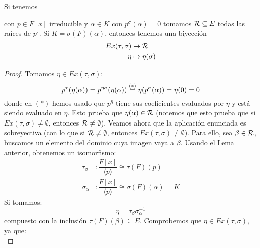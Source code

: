 \begin{prop}[Extensión]
    Si tenemos
    \begin{figure}[H]
        \centering
    \end{figure}
    \noindent
    con $p\in F[x]$ irreducible y $\alpha\in K$ con $p^\sigma(\alpha)=0$ tomamos $\mathcal{R}\subseteq E$ todas las raíces de $p^\tau$. Si $K = \sigma(F)(\alpha)$, entonces tenemos una biyección
    \begin{align*}
        Ex(\tau,\sigma) &\to \mathcal{R} \\
        \eta &\mapsto \eta(\sigma)
    \end{align*}
    \begin{proof}
        Tomamos $\eta \in Ex(\tau, \sigma)$:
        \begin{equation*}
            p^\tau(\eta(\alpha)) = p^{\eta \sigma}(\eta (\alpha)) \stackrel{(\ast)}{=} \eta(p^\sigma(\alpha)) = \eta(0) = 0
        \end{equation*}
        donde en $(\ast)$ hemos usado que $p^\eta$ tiene sus coeficientes evaluados por $\eta$ y está siendo evaluado en $\eta$. Esto prueba que $\eta(\alpha)\in \mathcal{R}$ (notemos que esto prueba que si $Ex(\tau,\sigma)\neq \emptyset $, entonces $\mathcal{R}\neq \emptyset $). Veamos ahora que la aplicación enunciada es sobreyectiva (con lo que si $\mathcal{R}\neq \emptyset $, entonces $Ex(\tau,\sigma)\neq \emptyset $). Para ello, sea $\beta\in \mathcal{R}$, buscamos un elemento del dominio cuya imagen vaya a $\beta$. Usando el Lema anterior, obtenemos un isomorfismo:
        \begin{align*}
            \tau_\beta &: \dfrac{F[x]}{\langle p \rangle }\cong \tau(F)(p) \\
            \sigma_\alpha &:\dfrac{F[x]}{\langle p \rangle }\cong \sigma(F)(\alpha) = K
        \end{align*}
        Si tomamos:
        \begin{equation*}
            \eta = \tau_\beta\sigma_\alpha^{-1}
        \end{equation*}
        compuesto con la inclusión $\tau(F)(\beta) \subseteq E$. Comprobemos que $\eta\in Ex(\tau,\sigma)$, ya que:
        \begin{equation*}

\end{equation*}
\end{proof}
\end{prop}
